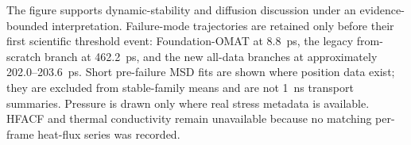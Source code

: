 The figure supports dynamic-stability and diffusion discussion under an evidence-bounded interpretation. Failure-mode trajectories are retained only before their first scientific threshold event: Foundation-OMAT at 8.8~ps, the legacy from-scratch branch at 462.2~ps, and the new all-data branches at approximately 202.0--203.6~ps. Short pre-failure MSD fits are shown where position data exist; they are excluded from stable-family means and are not 1~ns transport summaries. Pressure is drawn only where real stress metadata is available. HFACF and thermal conductivity remain unavailable because no matching per-frame heat-flux series was recorded.
